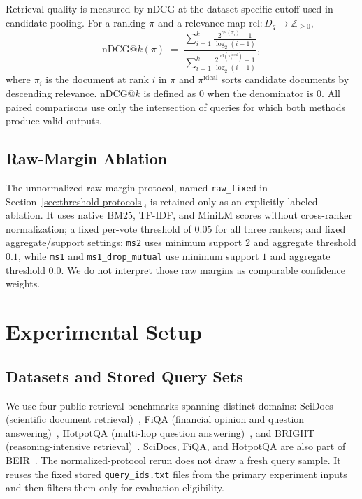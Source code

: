\documentclass[manuscript,anonymous,review]{acmart}
\begin{document}
Retrieval quality is measured by nDCG at the dataset-specific cutoff used in
candidate pooling. For a ranking $\pi$ and a relevance map $\mathrm{rel}:D_q
\to \mathbb{Z}_{\ge 0}$,
\begin{equation}
  \mathrm{nDCG@}k(\pi) \;=\; \frac{\displaystyle\sum_{i=1}^{k} \frac{2^{\mathrm{rel}(\pi_i)}-1}{\log_2(i+1)}}
  {\displaystyle\sum_{i=1}^{k} \frac{2^{\mathrm{rel}(\pi_i^{\mathrm{ideal}})}-1}{\log_2(i+1)}},
  \label{eq:ndcg}
\end{equation}
where $\pi_i$ is the document at rank $i$ in $\pi$ and $\pi^{\mathrm{ideal}}$
sorts candidate documents by descending relevance. nDCG@$k$ is defined as $0$
when the denominator is $0$. All paired comparisons use only the intersection
of queries for which both methods produce valid outputs.

\subsection{Raw-Margin Ablation}
\label{sec:raw-margin-ablation}

The unnormalized raw-margin protocol, named \texttt{raw\_fixed} in
Section~\ref{sec:threshold-protocols}, is retained only as an explicitly
labeled ablation. It uses native BM25, TF-IDF, and MiniLM scores without
cross-ranker normalization; a fixed per-vote threshold of $0.05$ for all
three rankers; and fixed aggregate/support settings: \texttt{ms2} uses
minimum support $2$ and aggregate threshold $0.1$, while \texttt{ms1} and
\texttt{ms1\_drop\_mutual} use minimum support $1$ and aggregate threshold
$0.0$. We do not interpret those raw margins as comparable confidence weights.

\section{Experimental Setup}
\label{sec:experimental-setup}

\subsection{Datasets and Stored Query Sets}
\label{sec:datasets}

We use four public retrieval benchmarks spanning distinct domains: SciDocs
(scientific document retrieval)~\cite{cohan2020scidocs}, FiQA (financial
opinion and question answering)~\cite{maia2018fiqa}, HotpotQA (multi-hop
question answering)~\cite{yang2018hotpotqa}, and BRIGHT (reasoning-intensive
retrieval)~\cite{su2024bright}. SciDocs, FiQA, and HotpotQA are also part of
BEIR~\cite{thakur2021beir}. The normalized-protocol rerun does not draw a fresh query
sample. It reuses the fixed stored \texttt{query\_ids.txt} files from the
primary experiment inputs and then filters them only for evaluation
eligibility.
\end{document}
